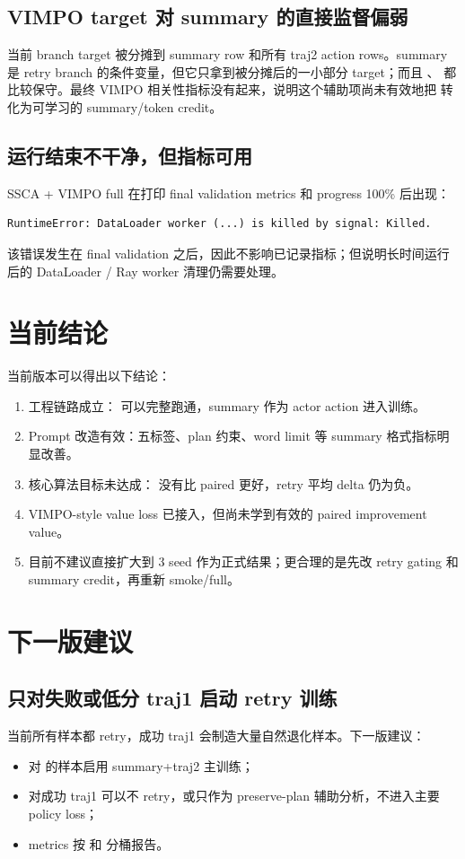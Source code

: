 \documentclass[10pt]{ctexart}
\begin{document}
\subsection{VIMPO target 对 summary 的直接监督偏弱}
当前 branch target 被分摊到 summary row 和所有 traj2 action rows。summary 是 retry branch 的条件变量，但它只拿到被分摊后的一小部分 target；而且 、 都比较保守。最终 VIMPO 相关性指标没有起来，说明这个辅助项尚未有效地把  转化为可学习的 summary/token credit。

\subsection{运行结束不干净，但指标可用}
SSCA + VIMPO full 在打印 final validation metrics 和 progress 100\% 后出现：
\begin{lstlisting}
RuntimeError: DataLoader worker (...) is killed by signal: Killed.
\end{lstlisting}
该错误发生在 final validation 之后，因此不影响已记录指标；但说明长时间运行后的 DataLoader / Ray worker 清理仍需要处理。

\section{当前结论}
当前版本可以得出以下结论：
\begin{enumerate}
  \item 工程链路成立： 可以完整跑通，summary 作为 actor action 进入训练。
  \item Prompt 改造有效：五标签、plan 约束、word limit 等 summary 格式指标明显改善。
  \item 核心算法目标未达成： 没有比 paired  更好，retry 平均 delta 仍为负。
  \item VIMPO-style value loss 已接入，但尚未学到有效的 paired improvement value。
  \item 目前不建议直接扩大到 3 seed 作为正式结果；更合理的是先改 retry gating 和 summary credit，再重新 smoke/full。
\end{enumerate}

\section{下一版建议}

\subsection{只对失败或低分 traj1 启动 retry 训练}
当前所有样本都 retry，成功 traj1 会制造大量自然退化样本。下一版建议：
\begin{itemize}
  \item 对  的样本启用 summary+traj2 主训练；
  \item 对成功 traj1 可以不 retry，或只作为 preserve-plan 辅助分析，不进入主要 policy loss；
  \item metrics 按  和  分桶报告。
\end{itemize}
\end{document}
